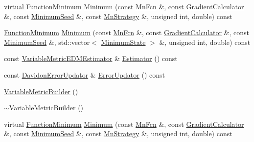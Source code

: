 \begin{DoxyCompactItemize}
\item 
virtual \mbox{\hyperlink{classROOT_1_1Minuit2_1_1FunctionMinimum}{Function\+Minimum}} \mbox{\hyperlink{classROOT_1_1Minuit2_1_1VariableMetricBuilder_af39ef2e38ec2bf3d94fa78fe0ed9a64a}{Minimum}} (const \mbox{\hyperlink{classROOT_1_1Minuit2_1_1MnFcn}{Mn\+Fcn}} \&, const \mbox{\hyperlink{classROOT_1_1Minuit2_1_1GradientCalculator}{Gradient\+Calculator}} \&, const \mbox{\hyperlink{classROOT_1_1Minuit2_1_1MinimumSeed}{Minimum\+Seed}} \&, const \mbox{\hyperlink{classROOT_1_1Minuit2_1_1MnStrategy}{Mn\+Strategy}} \&, unsigned int, double) const
\item 
\mbox{\hyperlink{classROOT_1_1Minuit2_1_1FunctionMinimum}{Function\+Minimum}} \mbox{\hyperlink{classROOT_1_1Minuit2_1_1VariableMetricBuilder_a6214271e1802f110e94725295f3900fc}{Minimum}} (const \mbox{\hyperlink{classROOT_1_1Minuit2_1_1MnFcn}{Mn\+Fcn}} \&, const \mbox{\hyperlink{classROOT_1_1Minuit2_1_1GradientCalculator}{Gradient\+Calculator}} \&, const \mbox{\hyperlink{classROOT_1_1Minuit2_1_1MinimumSeed}{Minimum\+Seed}} \&, std\+::vector$<$ \mbox{\hyperlink{classROOT_1_1Minuit2_1_1MinimumState}{Minimum\+State}} $>$ \&, unsigned int, double) const
\item 
const \mbox{\hyperlink{classROOT_1_1Minuit2_1_1VariableMetricEDMEstimator}{Variable\+Metric\+E\+D\+M\+Estimator}} \& \mbox{\hyperlink{classROOT_1_1Minuit2_1_1VariableMetricBuilder_a2440f7838cbff6043ee58272890aa210}{Estimator}} () const
\item 
const \mbox{\hyperlink{classROOT_1_1Minuit2_1_1DavidonErrorUpdator}{Davidon\+Error\+Updator}} \& \mbox{\hyperlink{classROOT_1_1Minuit2_1_1VariableMetricBuilder_aa10879d53daedb3e742f35d3c3f3b3d6}{Error\+Updator}} () const
\item 
\mbox{\hyperlink{classROOT_1_1Minuit2_1_1VariableMetricBuilder_a3fa1bd08281c31511236e97c865f893f}{Variable\+Metric\+Builder}} ()
\item 
\mbox{\hyperlink{classROOT_1_1Minuit2_1_1VariableMetricBuilder_ad3f542de61b199bb8305eb22713ad360}{$\sim$\+Variable\+Metric\+Builder}} ()
\item 
virtual \mbox{\hyperlink{classROOT_1_1Minuit2_1_1FunctionMinimum}{Function\+Minimum}} \mbox{\hyperlink{classROOT_1_1Minuit2_1_1VariableMetricBuilder_af39ef2e38ec2bf3d94fa78fe0ed9a64a}{Minimum}} (const \mbox{\hyperlink{classROOT_1_1Minuit2_1_1MnFcn}{Mn\+Fcn}} \&, const \mbox{\hyperlink{classROOT_1_1Minuit2_1_1GradientCalculator}{Gradient\+Calculator}} \&, const \mbox{\hyperlink{classROOT_1_1Minuit2_1_1MinimumSeed}{Minimum\+Seed}} \&, const \mbox{\hyperlink{classROOT_1_1Minuit2_1_1MnStrategy}{Mn\+Strategy}} \&, unsigned int, double) const

\end{DoxyCompactItemize}
